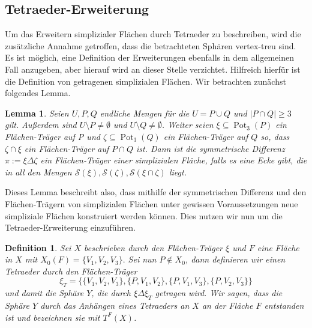 \documentclass[12pt,titlepage,twoside,cleardoublepage]{article}
\theoremstyle{nummermitklammern}
\newtheorem{lemma}[temp]{Lemma}
\newtheorem{definition}[temp]{Definition}
\newtheorem{definition}[zahl]{Definition}
\newtheorem{lemma}[zahl]{Lemma}
\numberwithin{equation}{section}
\DeclareMathOperator{\Pot}{Pot}
\begin{document}
  \subsection{Tetraeder-Erweiterung}
 Um das Erweitern simplizialer Flächen durch Tetraeder zu beschreiben, wird die zusätzliche Annahme getroffen, dass die betrachteten Sphären vertex-treu sind. Es ist möglich, eine Definition der Erweiterungen ebenfalls in dem allgemeinen Fall anzugeben, aber hierauf wird an dieser Stelle verzichtet.
 Hilfreich hierfür ist die Definition von getragenen simplizialen Flächen. Wir betrachten zunächst folgendes Lemma.
\begin{lemma}
Seien $U,P,Q$ endliche Mengen für die $U=P\cup Q$ und $\vert P\cap Q \vert \geq 3$ gilt. Außerdem sind $U\setminus P\neq \emptyset$ und $U\setminus Q \neq \emptyset$. Weiter seien $\xi \subseteq \Pot_3(P)$ ein Flächen-Träger auf P und $\zeta \subseteq \Pot_3(Q)$ ein Flächen-Träger auf $Q$ so, dass $\zeta \cap \xi$ ein Flächen-Träger auf $P \cap Q$ ist. Dann ist die symmetrische Differenz $\pi :=\xi \Delta \zeta$ ein Flächen-Träger einer simplizialen Fläche, falls es eine Ecke gibt, die in all den Mengen $\mathcal{S}(\xi),\mathcal{S}(\zeta),\mathcal{S}(\xi\cap\zeta)$ liegt. 
\end{lemma}
Dieses Lemma beschreibt also, dass mithilfe der symmetrischen Differenz und den Flächen-Trägern von simplizialen Flächen unter gewissen Voraussetzungen neue simpliziale Flächen konstruiert werden können. Dies nutzen wir nun um die Tetraeder-Erweiterung einzuführen.
\begin{definition}
Sei $X$ beschrieben durch den Flächen-Träger $\xi$ und $F$ eine Fläche in $X$ mit $X_0(F)=\{V_1,V_2,V_3\}.$ Sei nun $P\notin X_0$, dann definieren wir einen Tetraeder durch den Flächen-Träger
\[
\xi_T=\{\{V_1,V_2,V_3\},\{P,V_1,V_2\},\{P,V_1,V_3\},\{P,V_2,V_3\}\}
\] 
und damit die Sphäre $Y$, die durch $\xi \Delta \xi_T$ getragen wird. Wir sagen, dass die Sphäre $Y$ durch das Anhängen eines Tetraeders an $X$ an der Fläche $F$ entstanden ist und bezeichnen sie mit $T^F(X)$.
\end{definition}
\end{document}
